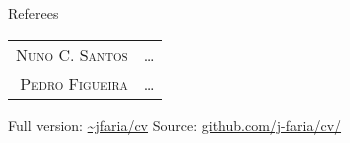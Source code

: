 \documentclass[10pt]{article}
\begin{document}
\fi


\ifreferees

\vspace{3in}
{\Large\scshape\raggedright\sffamily Referees}
\newcommand{\service}[2]{
  \textsc{#1} & #2\\[1em]
}
\begin{longtable}{r|p{10cm}}
  \service{Nuno C. Santos}{\ldots}
  \service{Pedro Figueira}{\ldots}
\end{longtable}

\fi

\null\vfill
\footnotesize{
  Full version:  \href{http://j-faria.github.io/cv}{\textasciitilde jfaria/cv} \qquad %
  Source:  \href{https://github.com/j-faria/cv}{github.com/j-faria/cv/}
}
\end{document}
